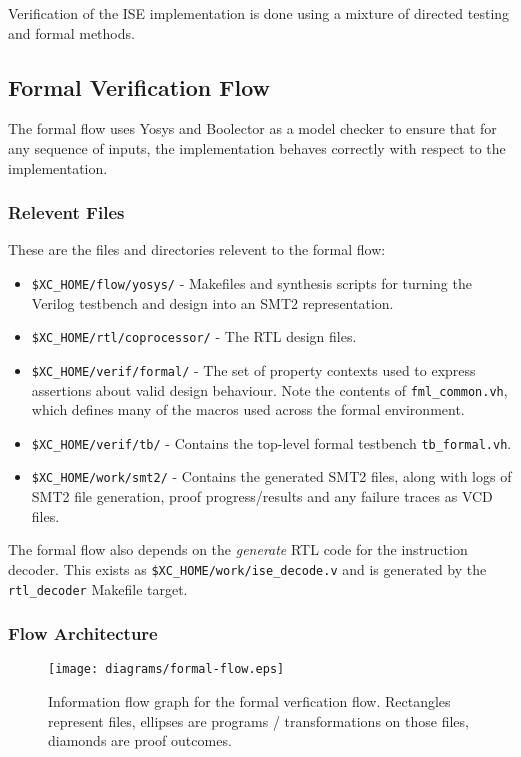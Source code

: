 
Verification of the ISE implementation is done using a mixture of
directed testing and formal methods.

\subsection{Formal Verification Flow}

The formal flow uses Yosys and Boolector as a model checker to ensure that
for any sequence of inputs, the implementation behaves correctly with
respect to the implementation.

\subsubsection{Relevent Files}

These are the files and directories relevent to the formal flow:

\begin{itemize}
\item {\tt \$XC\_HOME/flow/yosys/} - 
    Makefiles and synthesis scripts for turning the Verilog testbench
    and design into an SMT2 representation.
\item {\tt \$XC\_HOME/rtl/coprocessor/} - 
    The RTL design files.
\item {\tt \$XC\_HOME/verif/formal/} - 
    The set of property contexts used to express assertions about valid
    design behaviour. Note the contents of {\tt fml\_common.vh}, which
    defines many of the macros used across the formal environment.
\item {\tt \$XC\_HOME/verif/tb/} - 
    Contains the top-level formal testbench {\tt tb\_formal.vh}.
\item {\tt \$XC\_HOME/work/smt2/} - 
    Contains the generated SMT2 files, along with logs of SMT2 file
    generation, proof progress/results and any failure traces as VCD
    files.
\end{itemize}

The formal flow also depends on the {\em generate} RTL code for the
instruction decoder.
This exists as {\tt \$XC\_HOME/work/ise\_decode.v} and is generated by
the {\tt rtl\_decoder} Makefile target.

\subsubsection{Flow Architecture}

\begin{figure}[h]
\centering
\texttt{[image: diagrams/formal-flow.eps]}
\caption{Information flow graph for the formal verfication flow. Rectangles
represent files, ellipses are programs / transformations on those files,
diamonds are proof outcomes.}
\label{fig:formal-flow}
\end{figure}

